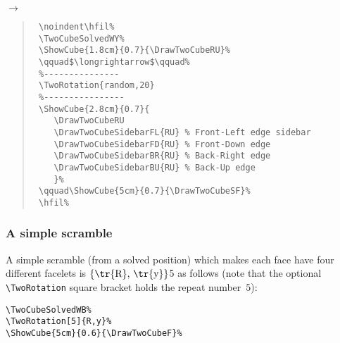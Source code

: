 \documentclass[a4paper]{article}
\begin{document}
\bigskip
          
 \noindent\hfil%
 \TwoCubeSolvedWY%
 \qquad$\longrightarrow$\qquad%
 \qquad{}%
 \hfil%

 \bigskip
 
 
 \begin{quote}
 \begin{verbatim}
 \noindent\hfil%
 \TwoCubeSolvedWY%
 \ShowCube{1.8cm}{0.7}{\DrawTwoCubeRU}%
 \qquad$\longrightarrow$\qquad%
 %---------------
 \TwoRotation{random,20}
 %----------------
 \ShowCube{2.8cm}{0.7}{
    \DrawTwoCubeRU
    \DrawTwoCubeSidebarFL{RU} % Front-Left edge sidebar
    \DrawTwoCubeSidebarFD{RU} % Front-Down edge
    \DrawTwoCubeSidebarBR{RU} % Back-Right edge
    \DrawTwoCubeSidebarBU{RU} % Back-Up edge
    }%
 \qquad\ShowCube{5cm}{0.7}{\DrawTwoCubeSF}%
 \hfil%
  \end{verbatim}
  \end{quote}

 
 
\subsubsection*{A simple scramble}

A simple scramble (from a solved position)  which 
makes each face have four different facelets is $\left\{\mbox{\tr{R}, 
\tr{y}}\right\}$5 as follows (note that the  optional \verb!\TwoRotation! 
square bracket  holds the repeat number~$5$): 

\bigskip

\begin{minipage}{0.3\textwidth}
\centering
\TwoCubeSolvedWB%
%
%
\end{minipage}
    \hspace{2cm}
\begin{minipage}{0.3\textwidth}
\begin{verbatim}
\TwoCubeSolvedWB% 
\TwoRotation[5]{R,y}%
\ShowCube{5cm}{0.6}{\DrawTwoCubeF}%
\end{verbatim}
 \end{minipage}
\end{document}
